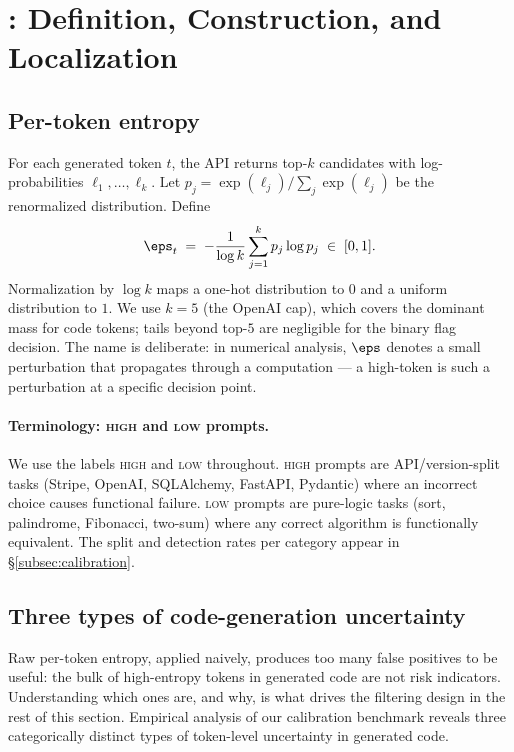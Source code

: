 \section{\eps: Definition, Construction, and Localization}
\label{sec:epsilon}

\subsection{Per-token entropy}
\label{subsec:per-token}

For each generated token $t$, the API returns top-$k$ candidates with
log-probabilities $\ell_1, \dots, \ell_k$. Let
$p_j = \exp(\ell_j) / \sum_j \exp(\ell_j)$ be the renormalized
distribution. Define
\begin{equation}
    \eps_t \;=\; -\frac{1}{\log k} \sum_{j=1}^{k} p_j \log p_j
    \;\in\; [0,1].
    \label{eq:eps}
\end{equation}
Normalization by $\log k$ maps a one-hot distribution to $0$ and a
uniform distribution to $1$. We use $k=5$ (the OpenAI cap), which
covers the dominant mass for code tokens; tails beyond top-$5$ are
negligible for the binary flag decision. The name is deliberate: in
numerical analysis, $\eps$ denotes a small perturbation that
propagates through a computation --- a high-\eps token is such a
perturbation at a specific decision point.

\paragraph{Terminology: \textsc{high} and \textsc{low} prompts.}
We use the labels \textsc{high} and \textsc{low} throughout.
\textsc{high} prompts are API/version-split tasks (Stripe, OpenAI,
SQLAlchemy, FastAPI, Pydantic) where an incorrect choice causes
functional failure. \textsc{low} prompts are pure-logic tasks (sort,
palindrome, Fibonacci, two-sum) where any correct algorithm is
functionally equivalent. The split and detection rates per category
appear in \S\ref{subsec:calibration}.

\subsection{Three types of code-generation uncertainty}
\label{subsec:types}

Raw per-token entropy, applied naively, produces too many false
positives to be useful: the bulk of high-entropy tokens in generated
code are not risk indicators. Understanding which ones are, and why,
is what drives the filtering design in the rest of this section.
Empirical analysis of our calibration benchmark reveals three
categorically distinct types of token-level uncertainty in generated
code.

